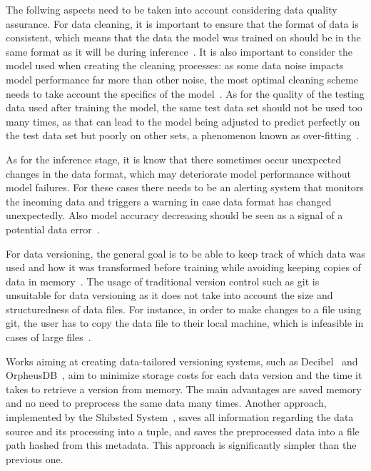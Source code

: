 The follwing aspects need to be taken into account considering data quality assurance. For data cleaning, it is important to ensure that the format of data is consistent, which means that the data the model was trained on should be in the same format as it will be during inference~\cite{polyzotisDataLifecycleChallenges2018}. It is also important to consider the model used when creating the cleaning processes: as some data noise impacts model performance far more than other noise, the most optimal cleaning scheme needs to take account the specifics of the model~\cite{renggliDataQualityDrivenView2021}. As for the quality of the testing data used after training the model, the same test data set should not be used too many times, as that can lead to the model being adjusted to predict perfectly on the test data set but poorly on other sets, a phenomenon known as over-fitting~\cite{renggliDataQualityDrivenView2021}.

As for the inference stage, it is know that there sometimes occur unexpected changes in the data format, which may deteriorate model performance without model failures. For these cases there needs to be an alerting system that monitors the incoming data and triggers a warning in case data format has changed unexpectedly. Also model accuracy decreasing should be seen as a signal of a potential data error~\cite{polyzotisDataLifecycleChallenges2018}.

For data versioning, the general goal is to be able to keep track of which data was used and how it was transformed before training while avoiding keeping copies of data in memory~\cite{maddoxDecibelRelationalDataset2016}. The usage of traditional version control such as git is unsuitable for data versioning as it does not take into account the size and structuredness of data files. For instance, in order to make changes to a file using git, the user has to copy the data file to their local machine, which is infeasible in cases of large files~\cite{maddoxDecibelRelationalDataset2016}.

Works aiming at creating data-tailored versioning systems, such as Decibel~\cite{maddoxDecibelRelationalDataset2016} and OrpheusDB~\cite{huangEffectiveDataVersioning2019}, aim to minimize storage costs for each data version and the time it takes to retrieve a version from memory. The main advantages are saved memory and no need to preprocess the same data many times. Another approach, implemented by the Shibsted System~\cite{vanderweideVersioningEndtoEndMachine2017}, saves all information regarding the data source and its processing into a tuple, and saves the preprocessed data into a file path hashed from this metadata. This approach is significantly simpler than the previous one.

